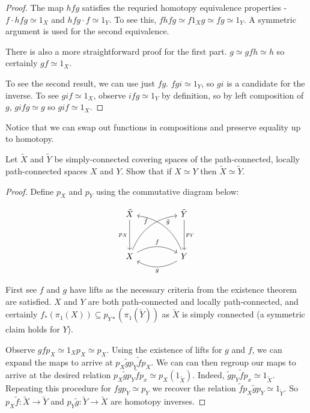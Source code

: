\documentclass[10pt]{article}
\begin{document}
\begin{proof}
	The map $hfg$ satisfies the requried homotopy equivalence properties - $f \cdot hfg
	\simeq 1_X$ and  $hfg \cdot f \simeq 1_Y$. To see this, $fhfg \simeq f1_Xg
	\simeq fg \simeq 1_Y$. A symmetric argument is used for the second
	equivalence.

	There is also a more straightforward proof for the first part. $g \simeq gfh \simeq h$ so certainly
	$gf \simeq 1_X$.

	To see the second result, we can use just $fg$. $fgi \simeq 1_Y$, so $gi$ is
	a candidate for the inverse. To see $gif \simeq 1_X$, observe $ifg \simeq
	1_Y$ by definition, so by left composition of $g$, $gifg \simeq g$ so $gif
	\simeq 1_X$.
\end{proof}

Notice that we can swap out functions in compositions and preserve
equality up to homotopy.

\begin{exercise}
	Let $\tilde{X}$ and $\tilde{Y}$ be simply-connected covering spaces of the
	path-connected, locally path-connected spaces $X$ and $Y$. Show that if
	$X \simeq Y$ then $\tilde{X} \simeq \tilde{Y}$.
\end{exercise}

\begin{proof}

	Define $p_X$ and $p_Y$ using the commutative diagram below:

	\[
\begin{tikzcd}
\tilde{X} \arrow[dd, "p_X"']                                      &  & \tilde{Y} \arrow[dd, "p_Y"]                                         \\
                                                                  &  &                                                                     \\
X \arrow[rr, "f", bend left] \arrow[rruu, "\tilde{f}", bend left] &  & Y \arrow[ll, "g", bend left] \arrow[lluu, "\tilde{g}"', bend right]
\end{tikzcd}
\]

	First see $f$ and $g$ have lifts as the necessary criteria from the existence
	theorem are satisfied. $X$ and $Y$ are both path-connected and
	locally path-connected, and certainly $f_*(\pi_1(X)) \subseteq
	p_{Y*}(\pi_1(\tilde{Y}))$ as $\tilde{X}$ is simply connected (a symmetric
	claim holds for $Y$).

	Observe $gfp_X \simeq 1_Xp_X \simeq p_X$. Using the existence of lifts for $g$ and
	$f$, we can expand the maps to arrive at $p_X\tilde{g}p_Y\tilde{f}p_X$. We
	can can then regroup our maps to arrive at the desired relation
	$p_X\tilde{g}p_Y\tilde{f}p_x \simeq p_X(1_{\tilde{X}})$.  Indeed,
	$\tilde{g}p_Y\tilde{f}p_x \simeq 1_{\tilde{X}}$. Repeating this procedure for
	$fgp_Y \simeq p_Y$ we recover the relation $\tilde{f}p_X\tilde{g}p_Y \simeq
	1_{\tilde{Y}}$. So $p_X\tilde{f}: \tilde{X} \to \tilde{Y}$ and $p_Y\tilde{g}:
	\tilde{Y} \to \tilde{X}$ are homotopy inverses.
\end{proof}
\end{document}
